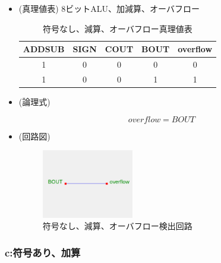 \documentclass[11pt,a4j]{jsarticle}
\begin{document}
    \begin{itemize}
    
    \item (真理値表)
    8ビットALU、加減算、オーバフロー
    \begin{table}[htb]
  \begin{center}
    \caption{符号なし、減算、オーバフロー真理値表}
    \begin{tabular}{cccc|c} \toprule
ADDSUB & SIGN & COUT & BOUT & overflow \\ \midrule
1 & 0 & 0 & 0 & 0 \\
1 & 0 & 0 & 1 & 1 \\ \bottomrule
    \end{tabular}
    \label{}
  \end{center}
 \end{table}
    
    \item (論理式)
    
    \begin{equation}
    overflow = BOUT
    \end{equation}
    
    \item (回路図)
    
    \begin{figure}[htbp]
  \centering
  \includegraphics[width=4cm,clip]{3-b.png}
  \caption{符号なし、減算、オーバフロー検出回路}
  \label{fig:3-b}
 \end{figure}
    
    \end{itemize}
    
    \clearpage
    
    \subsubsection{c:符号あり、加算}
    
\end{document}
